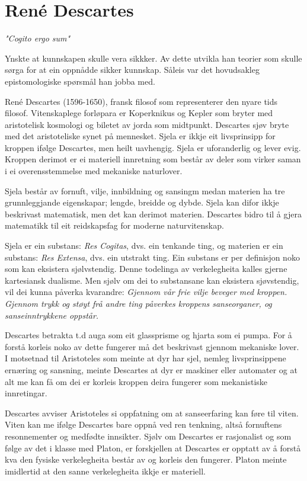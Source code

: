 \documentclass[a4paper]{IEEEtran}
\begin{document}
\newpage
\section{René Descartes}
\label{descartes}\bigskip
\begin{center}
    \textit{"Cogito ergo sum"}\bigskip    
\end{center}


Ynskte at kunnskapen skulle vera sikkker. Av dette utvikla han teorier som skulle sørga for at ein oppnådde sikker kunnskap. Såleis var det hovudsakleg epistomologiske spørsmål han jobba med.\bigskip

René Descartes (1596-1650), fransk filosof som representerer den nyare tids filosof. Vitenskaplege forløpara er Koperknikus og Kepler som bryter med aristotelisk kosmologi og biletet av jorda som midtpunkt. Descartes sjøv bryte med det aristoteliske synet på mennesket. Sjela er ikkje eit livsprinsipp for kroppen ifølge Descartes, men heilt uavhengig. Sjela er uforanderlig og lever evig. Kroppen derimot er ei materiell innretning som består av deler som virker saman i ei overensstemmelse med mekaniske naturlover.\bigskip

Sjela består av fornuft, vilje, innbildning og sansingm medan materien ha tre grunnleggjande eigenskapar; lengde, breidde og dybde. Sjela kan difor ikkje beskrivast matematisk, men det kan derimot materien. Descartes bidro til å gjera matematikk til eit reidskapsfag for moderne naturvitenskap.\bigskip

Sjela er ein substans: \textit{Res Cogitas}, dvs. ein tenkande ting, og materien er ein substans: \textit{Res Extensa}, dvs. ein utstrakt ting. Ein substans er per definisjon noko som kan eksistera sjølvstendig. Denne todelinga av verkelegheita kalles gjerne kartesiansk dualisme. Men sjølv om dei to substansane kan eksistera sjøvstendig, vil dei kunna påverka kvarandre: \textit{Gjennom vår frie vilje beveger med kroppen. Gjennom trykk og støyt frå andre ting påverkes kroppens sanseorganer, og sanseinntrykkene oppstår.}\bigskip

Descartes betrakta t.d auga som eit glassprisme og hjarta som ei pumpa. For å forstå korleis noko av dette fungerer må det beskrivast gjennom mekaniske lover. I motsetnad til Aristoteles som meinte at dyr har sjel, nemleg livsprinsippene ernæring og sansning, meinte Descartes at dyr er maskiner eller automater og at alt me kan få om dei er korleis kroppen deira fungerer som mekanistiske innretingar.\bigskip

Descartes avviser Aristoteles si oppfatning om at sanseerfaring kan føre til viten. Viten kan me ifølge Descartes bare oppnå ved ren tenkning, altså fornuftens resonnementer og medfødte innsikter. Sjølv om Descartes er rasjonalist og som følge av det i klasse med Platon, er forskjellen at Descartes er opptatt av å forstå kva den fysiske verkelegheita består av og korleis den fungerer. Platon meinte imidlertid at den sanne verkelegheita ikkje er materiell.\bigskip
\end{document}
